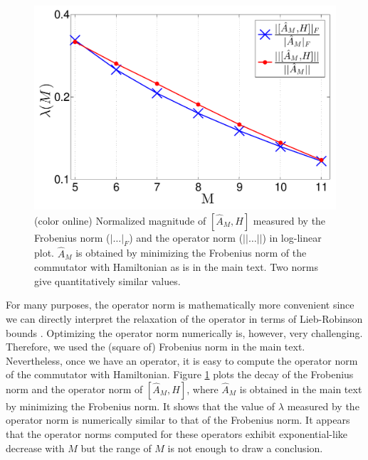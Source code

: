 \documentclass[twocolumn,superscriptaddress, prb]{revtex4-1}
\begin{document}
\begin{figure}
\includegraphics[width=1.0\linewidth]{infinite_ham_opnorm.pdf}
\centering
\caption{(color online) Normalized magnitude of $[\hat{A}_M, H]$ measured by the Frobenius norm ($|\ldots|_F$) and the operator norm ($||\ldots||$)
in log-linear plot.
$\hat{A}_M$ is obtained by minimizing the Frobenius norm of the commutator with Hamiltonian as is in the main text.
Two norms give quantitatively similar values.
}
\label{fig:op_norm}
\end{figure}

For many purposes, the operator norm is mathematically more convenient
since we can directly interpret the relaxation of the operator in terms of Lieb-Robinson bounds \cite{Lieb:1972,Bravyi:2006}.
Optimizing the operator norm numerically is, however, very challenging. Therefore, we used the (square of) Frobenius norm in the main text.
Nevertheless, once we have an operator, it is easy to compute the operator norm of the commutator with Hamiltonian.
Figure \ref{fig:op_norm} plots the decay of the Frobenius norm and the operator norm of $[\hat{A}_M,H]$,
where $\hat{A}_M$ is obtained in the main text by minimizing the Frobenius norm.
It shows that the value of $\lambda$ measured by the operator norm is numerically similar to that of the Frobenius norm.
It appears that the operator norms computed for these operators exhibit exponential-like decrease with $M$ but
the range of $M$ is not enough to draw a conclusion.
\end{document}
